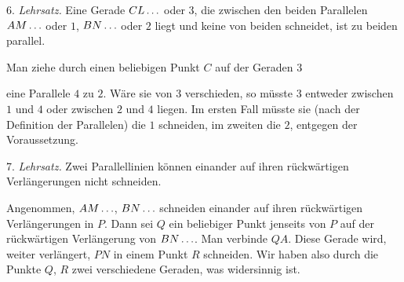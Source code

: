 6. \emph{Lehrsatz.} Eine Gerade $CL\mathinner{.\,.\,.}$ oder $3$, die zwischen den beiden Parallelen $AM\mathinner{.\,.\,.}$ oder $1$, $BN\mathinner{.\,.\,.}$ oder $2$ liegt und keine von beiden schneidet, ist zu beiden parallel.

 Man ziehe durch einen beliebigen Punkt $C$ auf der Geraden $3$

\begin{center}

\end{center}
\noindent eine Parallele $4$ zu $2$. Wäre sie von $3$ verschieden, so müsste $3$ entweder zwischen $1$ und $4$ oder zwischen $2$ und $4$ liegen. Im ersten Fall müsste sie (nach der Definition der Parallelen) die $1$ schneiden, im zweiten die $2$, entgegen der Voraussetzung.

7. \emph{Lehrsatz.} Zwei Parallellinien können einander auf ihren rückwärtigen Verlängerungen nicht schneiden.

\begin{center}

\end{center}

 Angenommen, $AM\mathinner{.\,.\,.}$, $BN\mathinner{.\,.\,.}$ schneiden einander auf ihren rückwärtigen Verlängerungen in $P$. Dann sei $Q$ ein beliebiger Punkt jenseits von $P$ auf der rückwärtigen Verlängerung von $BN\mathinner{.\,.\,.}$. Man verbinde $QA$. Diese Gerade wird, weiter verlängert, $PN$ in einem Punkt $R$ schneiden. Wir haben also durch die Punkte $Q$, $R$ zwei verschiedene Geraden, was widersinnig ist.

